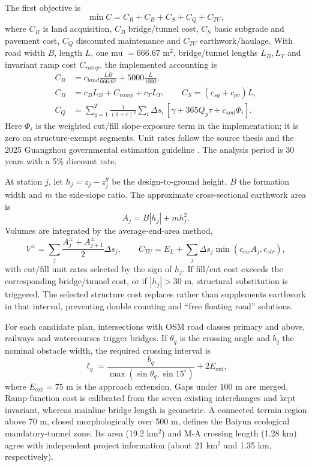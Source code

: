 \documentclass[preprint,12pt]{elsarticle}
\begin{document}
The first objective is
\begin{equation}
\min C=C_R+C_B+C_S+C_Q+C_{TU},
\label{eq:lcc}
\end{equation}
where $C_R$ is land acquisition, $C_B$ bridge/tunnel cost, $C_S$ basic subgrade and pavement cost, $C_Q$ discounted maintenance and $C_{TU}$ earthwork/haulage. With road width $B$, length $L$, one mu $=666.67$ m$^2$, bridge/tunnel lengths $L_B,L_T$ and invariant ramp cost $C_{ramp}$, the implemented accounting is
\begin{align}
C_R&=c_{land}\frac{LB}{666.67}+5000\frac{L}{1000},\\
C_B&=c_B L_B+C_{ramp}+c_T L_T,\qquad
C_S=(c_{sg}+c_{pv})L,\label{eq:lccparts}\\
C_Q&=\sum_{y=1}^{T}\frac{1}{(1+r)^y}
\sum_i\Delta s_i\,[\gamma+365Q_y\tau+c_{soil}\Phi_i].
\end{align}
Here $\Phi_i$ is the weighted cut/fill slope-exposure term in the implementation; it is zero on structure-exempt segments. Unit rates follow the source thesis and the 2025 Guangzhou governmental estimation guideline \cite{guangzhou2025}. The analysis period is 30 years with a 5\% discount rate.

At station $j$, let $h_j=z_j-z^g_j$ be the design-to-ground height, $B$ the formation width and $m$ the side-slope ratio. The approximate cross-sectional earthwork area is
\begin{equation}
A_j=B|h_j|+m h_j^2.
\end{equation}
Volumes are integrated by the average-end-area method,
\begin{equation}
V^{\pm}=\sum_j\frac{A_j^{\pm}+A_{j+1}^{\pm}}{2}\Delta s_j,\qquad
C_{TU}=E_L+\sum_j\Delta s_j\min(c_{ew}A_j,c_{str}),
\label{eq:earthwork}
\end{equation}
with cut/fill unit rates selected by the sign of $h_j$. If fill/cut cost exceeds the corresponding bridge/tunnel cost, or if $|h_j|>30$ m, structural substitution is triggered. The selected structure cost replaces rather than supplements earthwork in that interval, preventing double counting and ``free floating road'' solutions.

For each candidate plan, intersections with OSM road classes primary and above, railways and watercourses trigger bridges. If $\theta_q$ is the crossing angle and $b_q$ the nominal obstacle width, the required crossing interval is
\begin{equation}
\ell_q=\frac{b_q}{\max(\sin\theta_q,\sin15^\circ)}+2E_{\mathrm{ext}},
\end{equation}
where $E_{\mathrm{ext}}=75$ m is the approach extension. Gaps under 100 m are merged. Ramp-function cost is calibrated from the seven existing interchanges and kept invariant, whereas mainline bridge length is geometric. A connected terrain region above 70 m, closed morphologically over 500 m, defines the Baiyun ecological mandatory-tunnel zone. Its area (19.2 km$^2$) and M-A crossing length (1.28 km) agree with independent project information (about 21 km$^2$ and 1.35 km, respectively).
\end{document}
